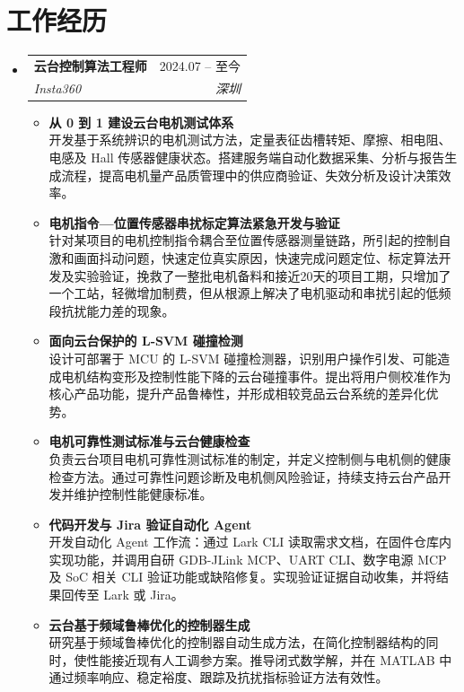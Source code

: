 \documentclass[letterpaper,11pt]{article}
\makeatletter
\newcommand{\resumeItem}[1]{
  \item\small{
    {#1 \vspace{-2pt}}
  }
}
\newcommand{\resumeSubheading}[4]{
  \vspace{-2pt}\item
    \begin{tabular*}{0.97\textwidth}[t]{l@{\extracolsep{\fill}}r}
      \textbf{#1} & #2 \\
      \textit{\small#3} & \textit{\small #4} \\
    \end{tabular*}\vspace{-7pt}
}
\newcommand{\resumeSubHeadingListStart}{\begin{itemize}[leftmargin=0.15in, label={}]}
\newcommand{\resumeSubHeadingListEnd}{\end{itemize}}
\newcommand{\resumeItemListStart}{\begin{itemize}}
\newcommand{\resumeItemListEnd}{\end{itemize}\vspace{-5pt}}
\makeatother
\begin{document}
\section{工作经历}
\enlargethispage{0.42in}
  \resumeSubHeadingListStart
    \resumeSubheading
      {云台控制算法工程师}{2024.07 -- 至今}
      {Insta360}{深圳}
      \resumeItemListStart
        \resumeItem{\normalsize{\textbf{从 0 到 1 建设云台电机测试体系}} \\
        \small{开发基于系统辨识的电机测试方法，定量表征齿槽转矩、摩擦、相电阻、电感及 Hall 传感器健康状态。搭建服务端自动化数据采集、分析与报告生成流程，提高电机量产品质管理中的供应商验证、失效分析及设计决策效率。}}
        \resumeItem{\normalsize{\textbf{电机指令—位置传感器串扰标定算法紧急开发与验证}} \\
        \small{针对某项目的电机控制指令耦合至位置传感器测量链路，所引起的控制自激和画面抖动问题，快速定位真实原因，快速完成问题定位、标定算法开发及实验验证，挽救了一整批电机备料和接近20天的项目工期，只增加了一个工站，轻微增加制费，但从根源上解决了电机驱动和串扰引起的低频段抗扰能力差的现象。}}
        \resumeItem{\normalsize{\textbf{面向云台保护的 L-SVM 碰撞检测}} \\
        \small{设计可部署于 MCU 的 L-SVM 碰撞检测器，识别用户操作引发、可能造成电机结构变形及控制性能下降的云台碰撞事件。提出将用户侧校准作为核心产品功能，提升产品鲁棒性，并形成相较竞品云台系统的差异化优势。}}
        \resumeItem{\normalsize{\textbf{电机可靠性测试标准与云台健康检查}} \\
        \small{负责云台项目电机可靠性测试标准的制定，并定义控制侧与电机侧的健康检查方法。通过可靠性问题诊断及电机侧风险验证，持续支持云台产品开发并维护控制性能健康标准。}}
        \resumeItem{\normalsize{\textbf{代码开发与 Jira 验证自动化 Agent}} \\
        \small{开发自动化 Agent 工作流：通过 Lark CLI 读取需求文档，在固件仓库内实现功能，并调用自研 GDB-JLink MCP、UART CLI、数字电源 MCP 及 SoC 相关 CLI 验证功能或缺陷修复。实现验证证据自动收集，并将结果回传至 Lark 或 Jira。}}
        \resumeItem{\normalsize{\textbf{云台基于频域鲁棒优化的控制器生成}} \\
        \small{研究基于频域鲁棒优化的控制器自动生成方法，在简化控制器结构的同时，使性能接近现有人工调参方案。推导闭式数学解，并在 MATLAB 中通过频率响应、稳定裕度、跟踪及抗扰指标验证方法有效性。}}
      \resumeItemListEnd
  \resumeSubHeadingListEnd

\end{document}
